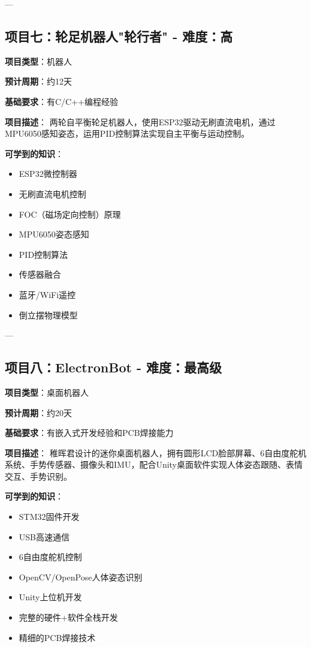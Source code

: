 \documentclass[12pt,a4paper]{article}
\begin{document}
---

\subsection{项目七：轮足机器人"轮行者" - 难度：高}

\textbf{项目类型}：机器人

\textbf{预计周期}：约12天

\textbf{基础要求}：有C/C++编程经验

\textbf{项目描述}：
两轮自平衡轮足机器人，使用ESP32驱动无刷直流电机，通过MPU6050感知姿态，运用PID控制算法实现自主平衡与运动控制。

\textbf{可学到的知识}：
\begin{itemize}
    \item ESP32微控制器
    \item 无刷直流电机控制
    \item FOC（磁场定向控制）原理
    \item MPU6050姿态感知
    \item PID控制算法
    \item 传感器融合
    \item 蓝牙/WiFi遥控
    \item 倒立摆物理模型
\end{itemize}

---

\subsection{项目八：ElectronBot - 难度：最高级}

\textbf{项目类型}：桌面机器人

\textbf{预计周期}：约20天

\textbf{基础要求}：有嵌入式开发经验和PCB焊接能力

\textbf{项目描述}：
稚晖君设计的迷你桌面机器人，拥有圆形LCD脸部屏幕、6自由度舵机系统、手势传感器、摄像头和IMU，配合Unity桌面软件实现人体姿态跟随、表情交互、手势识别。

\textbf{可学到的知识}：
\begin{itemize}
    \item STM32固件开发
    \item USB高速通信
    \item 6自由度舵机控制
    \item OpenCV/OpenPose人体姿态识别
    \item Unity上位机开发
    \item 完整的硬件+软件全栈开发
    \item 精细的PCB焊接技术
\end{itemize}
\end{document}
